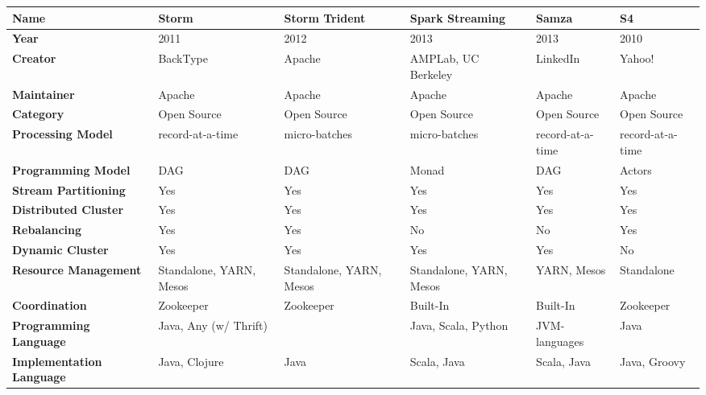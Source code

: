 \documentclass[ppgc,diss,english]{iiufrgs}
\begin{document}
\begin{table}[t]
\begin{center}
	\footnotesize
	\begin{tabular}{ | p{2.5cm} | p{2cm} | p{2.5cm} | p{2.5cm} | p{2cm} | p{2cm} |}
   		\hline
		\textbf{Name}                    & Storm & Storm Trident & Spark Streaming & Samza & S4 \\\hline
		\textbf{Year}                    & 2011 & 2012 & 2013 & 2013 & 2010 \\\hline
        \textbf{Creator}                 & BackType & Apache & AMPLab, UC Berkeley & LinkedIn & Yahoo! \\\hline
        \textbf{Maintainer}              & Apache & Apache & Apache & Apache & Apache \\\hline
        \textbf{Category}                & Open Source & Open Source & Open Source & Open Source & Open Source \\\hline
        \textbf{Processing Model}        & record-at-a-time & micro-batches & micro-batches & record-at-a-time & record-at-a-time \\\hline
        \textbf{Programming Model}       & DAG & DAG & Monad & DAG & Actors \\\hline
        
        \textbf{Stream Partitioning}     & Yes & Yes & Yes & Yes & Yes \\\hline
        \textbf{Distributed Cluster}     & Yes & Yes & Yes & Yes & Yes \\\hline
        \textbf{Rebalancing}             & Yes & Yes & No \cite{tomassi2014spark} & No & Yes \\\hline
        \textbf{Dynamic Cluster}         & Yes & Yes & Yes & Yes & No \\\hline
        
        \textbf{Resource Management}     & Standalone, YARN, Mesos & Standalone, YARN, Mesos & Standalone, YARN, Mesos & YARN, Mesos & Standalone \\\hline
        \textbf{Coordination}            & Zookeeper & Zookeeper & Built-In & Built-In & Zookeeper \\\hline
        
        \textbf{Programming Language}    & Java, Any (w/ Thrift) &  & Java, Scala, Python & JVM-languages & Java \\\hline
        \textbf{Implementation Language} & Java, Clojure & Java & Scala, Java & Scala, Java & Java, Groovy \\\hline
        

\end{tabular}
\end{center}
\end{table}
\end{document}
